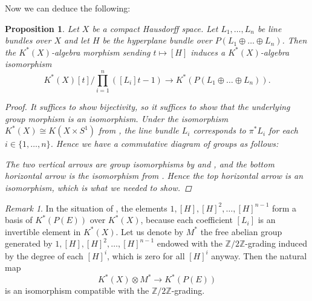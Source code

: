 \documentclass[12pt,a4paper]{amsart}
\theoremstyle{plain}
\newtheorem{prop}[thm]{Proposition}
\theoremstyle{definition}
\theoremstyle{remark}
\newtheorem{rem}[thm]{Remark}
\begin{document}
Now we can deduce the following:

\begin{prop}\label{prop:sumgraded}
  Let $X$ be a compact Hausdorff space.
  Let $L_{1}, \ldots, L_{n}$ be line bundles over $X$ and let $H$ be the hyperplane bundle over $P(L_{1} \oplus \ldots \oplus L_{n})$.
  Then the $K^{*}(X)$-algebra morphism sending $t \mapsto [H]$ induces a $K^{*}(X)$-algebra isomorphism
  \[ K^{*}(X)[t]/\prod_{i=1}^{n}([L_{i}]t - 1) \to K^{*}(P(L_{1} \oplus \ldots \oplus L_{n})). \]
  \begin{proof}
    It suffices to show bijectivity, so it suffices to show that the underlying group morphism is an isomorphism.
    Under the isomorphism $K^{*}(X) \cong K(X \times S^{1})$ from , the line bundle $L_{i}$ corresponds to $\pi^{*}L_{i}$ for each $i \in \{1, \ldots, n\}$.
    Hence we have a commutative diagram of groups as follows:
    
    \begin{center}
    \end{center}
    
    The two vertical arrows are group isomorphisms by  and , and the bottom horizontal arrow is the isomorphism from .
    Hence the top horizontal arrow is an isomorphism, which is what we needed to show.
  \end{proof}
\end{prop}

\begin{rem}\label{rem:free}
  In the situation of , the elements $1, [H], [H]^{2}, \ldots, [H]^{n-1}$ form a basis of $K^{*}(P(E))$ over $K^{*}(X)$, because each coefficient $[L_{i}]$ is an invertible element in $K^{*}(X)$.
  Let us denote by $M^{*}$ the free abelian group generated by $1, [H], [H]^{2}, \ldots, [H]^{n-1}$ endowed with the $\mathbb{Z}/2\mathbb{Z}$-grading induced by the degree of each $[H]^{i}$, which is zero for all $[H]^{i}$ anyway.
  Then the natural map
  \[ K^{*}(X) \otimes M^{*} \to K^{*}(P(E)) \]
  is an isomorphism compatible with the $\mathbb{Z}/2\mathbb{Z}$-grading.
\end{rem}
\end{document}
